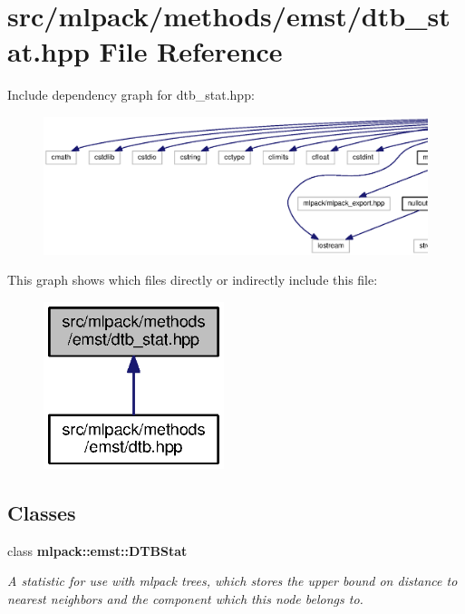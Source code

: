 \section{src/mlpack/methods/emst/dtb\+\_\+stat.hpp File Reference}
\label{dtb__stat_8hpp}
Include dependency graph for dtb\+\_\+stat.\+hpp\+:
\nopagebreak
\begin{figure}[H]
\begin{center}
\leavevmode
\includegraphics[width=350pt]{dtb__stat_8hpp__incl}
\end{center}
\end{figure}
This graph shows which files directly or indirectly include this file\+:
\nopagebreak
\begin{figure}[H]
\begin{center}
\leavevmode
\includegraphics[width=149pt]{dtb__stat_8hpp__dep__incl}
\end{center}
\end{figure}
\subsection*{Classes}
\begin{DoxyCompactItemize}
\item 
class {\bf mlpack\+::emst\+::\+D\+T\+B\+Stat}
\begin{DoxyCompactList}\small\item\em A statistic for use with mlpack trees, which stores the upper bound on distance to nearest neighbors and the component which this node belongs to. \end{DoxyCompactList}\end{DoxyCompactItemize}

